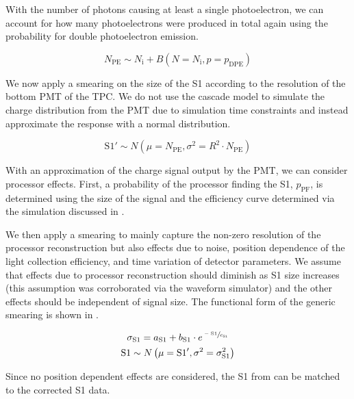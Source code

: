 With the number of photons causing at least a single photoelectron, we can account for how many photoelectrons were produced in total again using the probability for double photoelectron emission.


\begin{equation}
        N_{\textrm{PE}} \sim N_{\textrm{i}} + B(N=N_{\textrm{i}}, p=p_{\textrm{DPE}})
\end{equation}

We now apply a smearing on the size of the S1 according to the resolution of the bottom PMT of the TPC.  We do not use the cascade model to simulate the charge distribution from the PMT due to simulation time constraints and instead approximate the response with a normal distribution.

\begin{equation}
        \textrm{S1}' \sim N \left( \mu=N_{\textrm{PE}}, \sigma^2=R^2 \cdot N_{\textrm{PE}} \right)
\end{equation}

With an approximation of the charge signal output by the PMT, we can consider processor effects.  First, a probability of the processor finding the S1, $p_{\textrm{PF}}$,  is determined using the size of the signal and the efficiency curve determined via the simulation discussed in .    

We then apply a smearing to mainly capture the non-zero resolution of the processor reconstruction but also effects due to noise, position dependence of the light collection efficiency, and time variation of detector parameters.  We assume that effects due to processor reconstruction should diminish as S1 size increases (this assumption was corroborated via the waveform simulator) and the other effects should be independent of signal size.  The functional form of the generic smearing is shown in .


\begin{equation}
        \label{eqn:nerix_s1_smearing}
        \begin{gathered}
                \sigma_{\textrm{S1}} = a_{\textrm{S1}} + b_{\textrm{S1}} \cdot e^{\sfrac{-\textrm{S1}}{c_{\textrm{S1}}}} \\
                \textrm{S1} \sim N \left( \mu = \textrm{S1}', \sigma^2  = \sigma_{\textrm{S1}}^2 \right)
        \end{gathered}
\end{equation}

Since no position dependent effects are considered, the S1 from  can be matched to the corrected S1 data.


